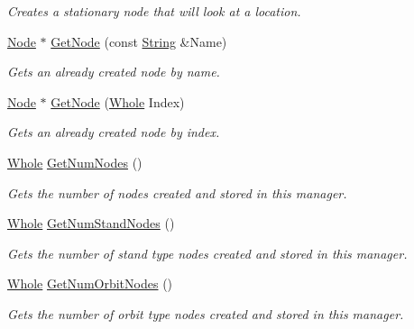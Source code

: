 \begin{DoxyCompactItemize}
\begin{DoxyCompactList}\small\item\em Creates a stationary node that will look at a location. \item\end{DoxyCompactList}\item 
\hyperlink{classphys_1_1Node}{Node} $\ast$ \hyperlink{classphys_1_1SceneManager_ae058104e2eebd36feb8cc84ff0e1d354}{GetNode} (const \hyperlink{namespacephys_aa03900411993de7fbfec4789bc1d392e}{String} \&Name)
\begin{DoxyCompactList}\small\item\em Gets an already created node by name. \item\end{DoxyCompactList}\item 
\hyperlink{classphys_1_1Node}{Node} $\ast$ \hyperlink{classphys_1_1SceneManager_a4b05a304bae8f187fa2474abe7b7f05f}{GetNode} (\hyperlink{namespacephys_a460f6bc24c8dd347b05e0366ae34f34a}{Whole} Index)
\begin{DoxyCompactList}\small\item\em Gets an already created node by index. \item\end{DoxyCompactList}\item 
\hyperlink{namespacephys_a460f6bc24c8dd347b05e0366ae34f34a}{Whole} \hyperlink{classphys_1_1SceneManager_a9b236739b4b524a282f84b58b524efa6}{GetNumNodes} ()
\begin{DoxyCompactList}\small\item\em Gets the number of nodes created and stored in this manager. \item\end{DoxyCompactList}\item 
\hyperlink{namespacephys_a460f6bc24c8dd347b05e0366ae34f34a}{Whole} \hyperlink{classphys_1_1SceneManager_ae0cf3beb3e8419c3385b53a3bd7dab8f}{GetNumStandNodes} ()
\begin{DoxyCompactList}\small\item\em Gets the number of stand type nodes created and stored in this manager. \item\end{DoxyCompactList}\item 
\hyperlink{namespacephys_a460f6bc24c8dd347b05e0366ae34f34a}{Whole} \hyperlink{classphys_1_1SceneManager_a5ad1eab41f98131cfdc359b5c2a73c72}{GetNumOrbitNodes} ()
\begin{DoxyCompactList}\small\item\em Gets the number of orbit type nodes created and stored in this manager. \item\end{DoxyCompactList}\item 

\end{DoxyCompactItemize}
